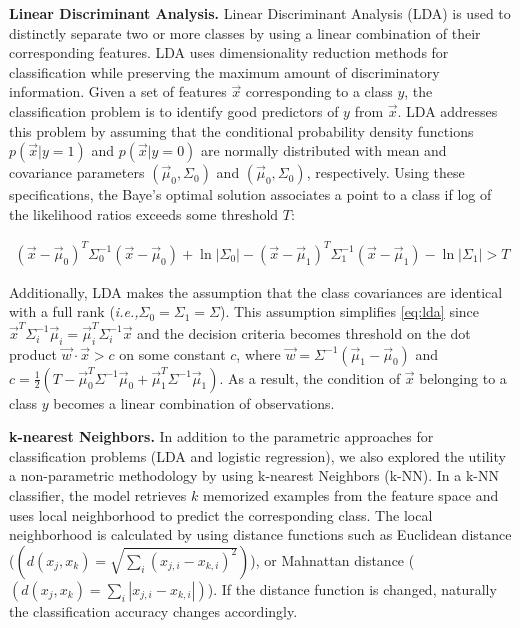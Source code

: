 \documentclass[acmlarge]{acmart}
\newcommand{\BfPara}[1]{{\noindent\bf#1.}\xspace\xspace}
\newcommand{\ie}{{\em i.e.,}\xspace}
\begin{document}
{\BfPara{Linear Discriminant Analysis} Linear Discriminant Analysis (LDA) is used to distinctly separate two or more classes by using a linear combination of their corresponding features. LDA uses dimensionality reduction methods for classification while preserving the maximum amount of discriminatory information. Given a set of features $\vec{x}$ corresponding to a class $y$, the classification problem is to identify good predictors of $y$ from $\vec{x}$. LDA addresses this problem by assuming that the conditional probability density functions $p(\vec{x}|y=1)$ and $p(\vec{x}|y=0)$ are normally distributed with mean and covariance parameters $(\vec{\mu}_{0},\Sigma_{0})$ and $(\vec{\mu}_{0},\Sigma_{0})$, respectively. Using these specifications, the Baye's optimal solution associates a point to a class if log of the likelihood ratios exceeds some threshold $T$:   

\begin{align} \label{eq:lda}
    \nonumber \left(\vec{x}-\vec{\mu}_{0}\right)^{T} \Sigma_{0}^{-1}\left(\vec{x}-\vec{\mu}_{0}\right)+\ln \left|\Sigma_{0}\right|-\left(\vec{x}-\vec{\mu}_{1}\right)^{T} \Sigma_{1}^{-1}\left(\vec{x}-\vec{\mu}_{1}\right)-\ln \left|\Sigma_{1}\right|>T
\end{align}

Additionally, LDA makes the assumption that the class covariances are identical with a full rank (\ie $\Sigma_{0} = \Sigma_{1} = \Sigma$). This assumption simplifies \autoref{eq:lda} since 
${\vec{x}^{T} \Sigma_{i}^{-1} \vec{\mu}_{i}=\vec{\mu}_{i}^{T} \Sigma_{i}^{-1} \vec{x}}$ and the decision criteria becomes threshold on the dot product $\vec{w} \cdot \vec{x}>c$ on some constant $c$, where $\vec{w}=\Sigma^{-1}\left(\vec{\mu}_{1}-\vec{\mu}_{0}\right)$ and $c=\frac{1}{2}\left(T-\vec{\mu}_{0}^{T} \Sigma^{-1} \vec{\mu}_{0}+\vec{\mu}_{1}^{T} \Sigma^{-1} \vec{\mu}_{1}\right)$. As a result, the condition of $\vec{x}$ belonging to a class $y$ becomes a linear combination of observations. 

\BfPara{k-nearest Neighbors}
In addition to the parametric approaches for classification problems (LDA and logistic regression), we also explored the utility a non-parametric methodology by using k-nearest Neighbors (k-NN). In a k-NN classifier, the model retrieves $k$ memorized examples from the feature space and uses local neighborhood to predict the corresponding class. The local neighborhood is calculated by using distance functions such as Euclidean distance ($\left(d\left(x_{j}, x_{k}\right)=\sqrt{\sum_{i}\left(x_{j, i}-x_{k, i}\right)^{2}}\right)$), or Mahnattan distance ($\left(d\left(x_{j}, x_{k}\right)=\sum_{i}\left|x_{j, i}-x_{k, i}\right|\right)$). If the distance function is changed, naturally the classification accuracy changes accordingly. 

}
\end{document}
